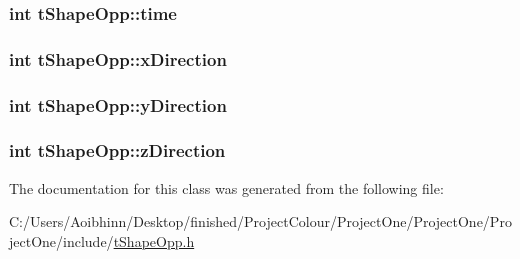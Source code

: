 \hypertarget{classt_shape_opp_aaa9b6325b31d0ce4af2e683f08fdc8de}{
\subsubsection[{time}]{\setlength{\rightskip}{0pt plus 5cm}int t\-Shape\-Opp\-::time}}\label{classt_shape_opp_aaa9b6325b31d0ce4af2e683f08fdc8de}
\hypertarget{classt_shape_opp_ac2eb74adf1ac7743b5c7e9162c398c26}{
\subsubsection[{x\-Direction}]{\setlength{\rightskip}{0pt plus 5cm}int t\-Shape\-Opp\-::x\-Direction}}\label{classt_shape_opp_ac2eb74adf1ac7743b5c7e9162c398c26}
\hypertarget{classt_shape_opp_a87294ad6c4634f1ac2ba4492a0951cf3}{
\subsubsection[{y\-Direction}]{\setlength{\rightskip}{0pt plus 5cm}int t\-Shape\-Opp\-::y\-Direction}}\label{classt_shape_opp_a87294ad6c4634f1ac2ba4492a0951cf3}
\hypertarget{classt_shape_opp_addec42a18fe788cd51dcc3045ec9a455}{
\subsubsection[{z\-Direction}]{\setlength{\rightskip}{0pt plus 5cm}int t\-Shape\-Opp\-::z\-Direction}}\label{classt_shape_opp_addec42a18fe788cd51dcc3045ec9a455}


The documentation for this class was generated from the following file\-:\begin{DoxyCompactItemize}
\item 
C\-:/\-Users/\-Aoibhinn/\-Desktop/finished/\-Project\-Colour/\-Project\-One/\-Project\-One/\-Project\-One/include/\hyperlink{t_shape_opp_8h}{t\-Shape\-Opp.\-h}\end{DoxyCompactItemize}
